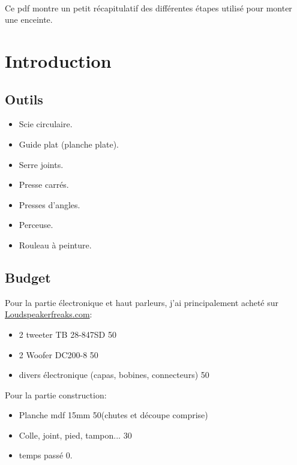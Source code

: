 \documentclass[a4paper,english]{report}
\makeatletter
\newcommand{\frontmatter}{\let\ps@plain\ps@empty\pagestyle{empty}}
\makeatother
\begin{document}
			\frontmatter %
			
			\newcommand{\HRule}{\rule{\linewidth}{1m}}
			\newcommand*{\figuretitle}[1]{%
				{\centering%
					\large
					\textbf{#1}%
					\par\medskip}%
			}
			
			\huge
			\begin{center}
				\\
			\end{center}
			\large
			
			Ce pdf montre un petit récapitulatif des différentes étapes utilisé pour monter une enceinte.
			\chapter{Introduction}
			\section{Outils}
			\begin{itemize}
				\item Scie circulaire.
				\item Guide plat (planche plate).
				\item Serre joints.
				\item Presse carrés.
				\item Presses d'angles.
				\item Perceuse.
				\item Rouleau à peinture.
			\end{itemize}
			
			\section{Budget}
			Pour la partie électronique et haut parleurs, j'ai principalement acheté sur \href{http://loudspeakerfreaks.com/intro.asp}{Loudspeakerfreaks.com}:
			\begin{itemize}
				\item 2 tweeter TB 28-847SD 50\texteuro
				\item 2 Woofer DC200-8 50\texteuro
				\item divers électronique (capas, bobines, connecteurs) 50\texteuro

			\end{itemize}
			Pour la partie construction:
			\begin{itemize}
				\item Planche mdf 15mm 50\texteuro (chutes et découpe comprise) 
				\item Colle, joint, pied, tampon... 30\texteuro
				\item temps passé 0\texteuro.				
			\end{itemize}
\end{document}
